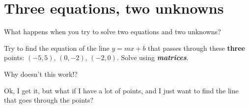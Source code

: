 
\section*{Three equations, two unknowns}

What happens when you try to solve two equations and two unknowns?


\begin{myExample}{
        Try to find the equation of the line $y = mx + b$ that passes through these {\bfseries three} points:
        $(-5,5)$, $(0,-2)$, $(-2, 0)$.
        Solve using {\bfseries\itshape matrices}.
    }
    \myWideMatrixTable
    \vspace{3em}
\end{myExample}

\begin{center}
\begin{tcolorbox}[width=2.5in]
    \centering 
    Why doesn't this work!?
\end{tcolorbox}
\end{center}



\begin{center}
    \begin{tcolorbox}[width=5.5in]
        Ok, I get it, but what if I have a lot of points,
        and I just want to find the  line that
         goes through the points?
    \end{tcolorbox}
    \end{center}
    